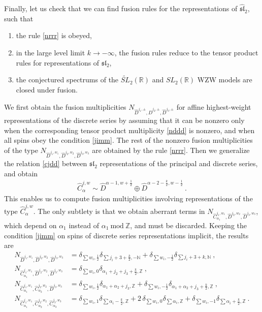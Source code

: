 \documentclass[12pt,a4paper,notitlepage]{report}
\numberwithin{equation}{section}
\theoremstyle{break}
\begin{document}
Finally, let us check that we can find fusion rules for the representations of $\widehat{\mathfrak{sl}}_2$, such that
\begin{enumerate}
 \item the rule \eqref{nrrr} is obeyed,
\item in the large level limit $k\rightarrow -\infty$, the fusion rules reduce to the tensor product rules for representations of $\mathfrak{sl}_2$,
\item the conjectured spectrums of the $\widetilde{SL}_2(\mathbb{R})$ and $SL_2(\mathbb{R})$ WZW models are closed under fusion.
\end{enumerate}
We first obtain the fusion multiplicities $N_{\hat{D}^{j_1,\pm},\hat{D}^{j_2,\pm},\hat{D}^{j_3,\pm}}$ for affine highest-weight representations of the discrete series  by assuming that it can be nonzero only when the corresponding tensor product multiplicity \eqref{nddd} is nonzero, and when all spins obey the condition \eqref{jimm}.
The rest of the nonzero fusion multiplicities of the type    
$N_{\hat{D}^{j_1,w_1},\hat{D}^{j_2,w_2},\hat{D}^{j_3,w_3}}$ are obtained by the rule \eqref{nrrr}.
Then we generalize the relation \eqref{cjdd} between $\mathfrak{sl}_2$ representations of the principal and discrete series, and obtain 
\begin{align}
 \hat{C}^{j,w}_\alpha \sim \hat{D}^{\alpha-1,w+\frac12} \oplus \hat{D}^{\alpha-2-\frac{k}{2},w-\frac12} \ .
\end{align}
This enables us to compute fusion multiplicities involving representations of the type $\hat{C}^{j,w}_\alpha$.
The only subtlety is that we obtain aberrant terms in $N_{\hat{C}^{j_1,w_1}_{\alpha_1},\hat{D}^{j_2,w_2},\hat{D}^{j_3,w_3}}$, which depend on $\alpha_1$ instead of $\alpha_1\ \text{mod}\ {\mathbb{Z}}$, and must be discarded.
Keeping the condition \eqref{jimm} on spins of discrete series representations implicit, the results are 
\begin{align}
 N_{\hat{D}^{j_1,w_1},\hat{D}^{j_2,w_2},\hat{D}^{j_3,w_3}} 
&= \delta_{\sum w_i,\frac12} \delta_{\sum j_i+3+\frac{k}{2},-{\mathbb{N}}} + \delta_{\sum w_i,-\frac12}\delta_{\sum j_i+3+k,{\mathbb{N}}} \ ,
\\
 N_{\hat{C}^{j_1,w_1}_{\alpha_1},\hat{D}^{j_2,w_2},\hat{D}^{j_3,w_3}} &= \delta_{\sum w_i,0} \delta_{\alpha_1+j_2+j_3+\frac{k}{2},{\mathbb{Z}}}\ ,
\\
 N_{\hat{C}^{j_1,w_1}_{\alpha_1},\hat{C}^{j_2,w_2}_{\alpha_2},\hat{D}^{j_3,w_3}} & = \delta_{\sum w_i,\frac12} \delta_{\alpha_1+\alpha_2+j_3,{\mathbb{Z}}} + \delta_{\sum w_i,-\frac12}\delta_{\alpha_1+\alpha_2+j_3+\frac{k}{2},{\mathbb{Z}}}\ ,
\\
N_{\hat{C}^{j_1,w_1}_{\alpha_1},\hat{C}^{j_2,w_2}_{\alpha_2},\hat{C}^{j_3,w_3}_{\alpha_3}} & = \delta_{\sum w_i,1}\delta_{\sum\alpha_i-\frac{k}{2},{\mathbb{Z}}} + 2\, \delta_{\sum w_i,0}\delta_{\sum \alpha_i,{\mathbb{Z}}} + \delta_{\sum w_i,-1}\delta_{\sum\alpha_i+\frac{k}{2},{\mathbb{Z}}}\ .
\end{align}
\end{document}
